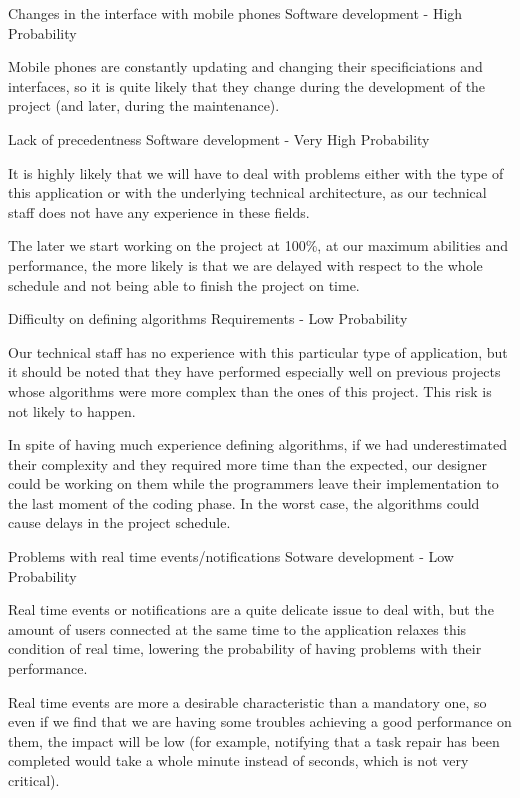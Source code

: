 \begin{risk}{Changes in the interface with mobile phones}
\riskcat Software development
 - High Probability 

Mobile phones are constantly updating and changing their specificiations and interfaces, so it is quite likely that they change during the development of the project (and later, during the maintenance).
\end{risk}

\begin{risk}{Lack of precedentness}
\riskcat Software development
 - Very High Probability 

It is highly likely that we will have to deal with problems either with the type of this application or with the underlying technical architecture, as our technical staff does not have any experience in these fields.

The later we start working on the project at 100\%, at our maximum abilities and performance, the more likely is that we are delayed with respect to the whole schedule and not being able to finish the project on time.
\end{risk}

\begin{risk}{Difficulty on defining algorithms}
\riskcat Requirements
 - Low Probability 

Our technical staff has no experience with this particular type of application, but it should be noted that they have performed especially well on previous projects whose algorithms were more complex than the ones of this project. This risk is not likely to happen.

In spite of having much experience defining algorithms, if we had underestimated their complexity and they required more time than the expected, our designer could be working on them while the programmers leave their implementation to the last moment of the coding phase. In the worst case, the algorithms could cause delays in the project schedule.
\end{risk}

\begin{risk}{Problems with real time events/notifications}
\riskcat Sotware development
 - Low Probability 

Real time events or notifications are a quite delicate issue to deal with, but the amount of users connected at the same time to the application relaxes this condition of real time, lowering the probability of having problems with their performance.

Real time events are more a desirable characteristic than a mandatory one, so even if we find that we are having some troubles achieving a good performance on them, the impact will be low (for example, notifying that a task repair has been completed would take a whole minute instead of seconds, which is not very critical).
\end{risk}

